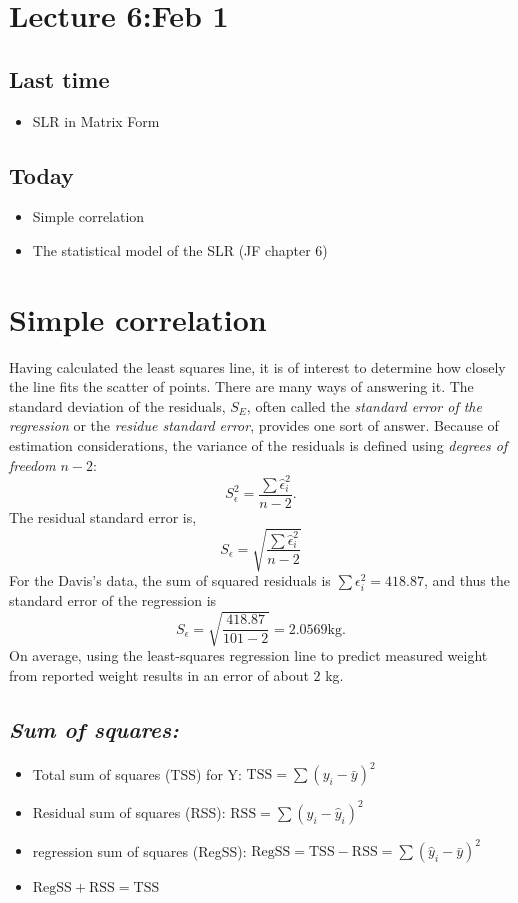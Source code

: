 \setcounter{section}{5}


\section{Lecture 6:Feb 1}


\subsection*{Last time}
\begin{itemize}
\item SLR in Matrix Form
\end{itemize}


\subsection*{Today}
\begin{itemize}
\item Simple correlation
\item The statistical model of the SLR (JF chapter 6)

\end{itemize}

\section*{Simple correlation}

Having calculated the least squares line, it is of interest to determine how closely the line fits the scatter of points.
There are many ways of answering it.  The standard deviation of the residuals, $S_E$, often called the {\it standard error of the regression} or the {\it residue standard error}, provides one sort of answer.
Because of estimation considerations, the variance of the residuals is defined using {\it degrees of freedom} $n-2$:
$$
S^2_\epsilon = \frac{\sum{\hat{\epsilon}_i^2}}{n - 2}.
$$
%
The residual standard error is,
$$
S_\epsilon = \sqrt{ \frac{\sum{\hat{\epsilon}_i^2}}{n - 2}}
$$
%
For the Davis's data, the sum of squared residuals is $\sum{\epsilon_i^2} = 418.87$, and thus the standard error of the regression is
$$
S_\epsilon=\sqrt{\frac{418.87}{101 - 2}} = 2.0569 \mbox{kg}.
$$
On average, using the least-squares regression line to predict measured weight from reported weight results in an error of about $2$ kg.
%
%
\subsection*{\it Sum of squares:}
\begin{itemize}
  \item Total sum of squares (TSS) for Y: $\mbox{TSS} = \sum(y_i - \bar{y})^2$
  \item Residual sum of squares (RSS): $\mbox{RSS} = \sum(y_i - \hat{y}_i)^2$
  \item regression sum of squares (RegSS): $\mbox{RegSS} = \mbox{TSS} - \mbox{RSS} = \sum(\hat{y}_i - \bar{y})^2$
  \item $\mbox{RegSS} + \mbox{RSS} = \mbox{TSS}$
\end{itemize}

